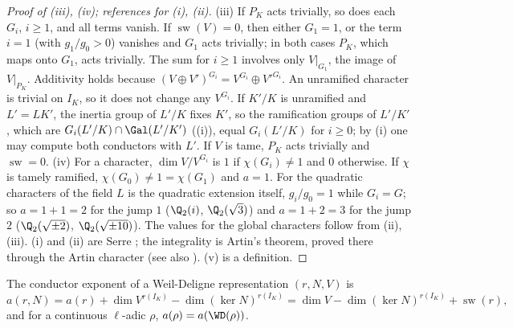 \begin{proof}[Proof of (iii), (iv); references for (i), (ii)]
(iii) If $P_K$ acts trivially, so does each $G_i$, $i\ge1$, and all terms vanish. If $\operatorname{sw}(V)=0$, then either $G_1=1$, or the term $i=1$ (with $g_1/g_0>0$) vanishes
and $G_1$ acts trivially; in both cases $P_K$, which maps onto $G_1$, acts trivially. The sum for $i\ge1$ involves only $V|_{G_1}$, the image of $V|_{P_K}$. Additivity
holds because $(V\oplus V')^{G_i}=V^{G_i}\oplus V'^{G_i}$. An unramified character is trivial on $I_K$, so it does not change any $V^{G_i}$. If $K'/K$ is unramified and
$L'=LK'$, the inertia group of $L'/K$ fixes $K'$, so the ramification groups of $L'/K'$, which are $G_i(L'/K)\cap\Gal(L'/K')$ ((i)), equal
$G_i(L'/K)$ for $i\ge0$; by (i) one may compute both conductors with $L'$. If $V$ is tame, $P_K$ acts trivially and $\operatorname{sw}=0$.
(iv) For a character, $\dim V/V^{G_i}$ is $1$ if $\chi(G_i)\ne1$ and $0$ otherwise. If $\chi$ is tamely ramified, $\chi(G_0)\ne1=\chi(G_1)$ and $a=1$. For the
quadratic characters of  the field $L$ is the quadratic extension itself, $g_i/g_0=1$ while $G_i=G$; so $a=1+1=2$ for the jump
$1$ ($\Q_2(i)$, $\Q_2(\sqrt3)$) and $a=1+2=3$ for the jump $2$ ($\Q_2(\sqrt{\pm2})$, $\Q_2(\sqrt{\pm10})$). The values for the global characters follow from
(ii), (iii). (i) and (ii) are Serre \cite[Chapter IV, Section 3, and Chapter VI, Section 2]{SerreLocalFields};
the integrality is Artin's theorem, proved there through the Artin character (see also \cite[Chapter 19]{SerreLinearReps}). (v) is a definition.
\end{proof}

\begin{definition}\label{def:local:conductor}
The conductor exponent of a Weil-Deligne representation $(r,N,V)$ is
\[
a(r,N)=a(r)+\dim V^{r(I_K)}-\dim(\ker N)^{r(I_K)}=\dim V-\dim(\ker N)^{r(I_K)}+\operatorname{sw}(r),
\]
and for a continuous $\ell$-adic $\rho$, $a(\rho)=a(\WD(\rho))$.
\end{definition}

